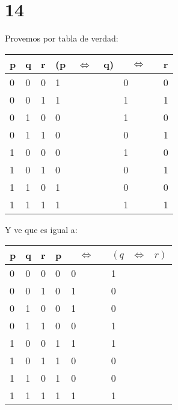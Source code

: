 \documentclass[12pt, fleqn]{article}                            %
\DeclareMathOperator \Space     {\quad}                         %
\DeclareMathOperator \MiniSpace {\;}                            %
\theoremstyle{break}                                            %
\newcommand \lEqual  {\MiniSpace \Leftrightarrow \MiniSpace}    %
\begin{document}
\clearpage
\section{14}

    Provemos por tabla de verdad: \\
    \begin{tabular}{|l|l|l|l|l|l|} 
        \hline
        p & q & r & (p $\lEqual$ q) &$\lEqual$  &r   \\ \hline
        0 & 0 & 0 &        1        &     0      &0   \\ \hline 
        0 & 0 & 1 &        1        &     1      &1   \\ \hline 
        0 & 1 & 0 &        0        &     1      &0   \\ \hline 
        0 & 1 & 1 &        0        &     0      &1   \\ \hline 
        1 & 0 & 0 &        0        &     1      &0   \\ \hline 
        1 & 0 & 1 &        0        &     0      &1   \\ \hline 
        1 & 1 & 0 &        1        &     0      &0   \\ \hline 
        1 & 1 & 1 &        1        &     1      &1   \\ \hline 
    \end{tabular}

    Y ve que es igual a: \\
        \begin{tabular}{|l|l|l|l|l|l|} 
        \hline
        p & q & r & p   & $\lEqual$   & $(q \lEqual r)$  \\ \hline
        0 & 0 & 0 & 0   &   0        &     1          \\ \hline 
        0 & 0 & 1 & 0   &   1        &     0          \\ \hline 
        0 & 1 & 0 & 0   &   1        &     0          \\ \hline 
        0 & 1 & 1 & 0   &   0        &     1          \\ \hline 
        1 & 0 & 0 & 1   &   1        &     1          \\ \hline 
        1 & 0 & 1 & 1   &   0        &     0          \\ \hline 
        1 & 1 & 0 & 1   &   0        &     0          \\ \hline 
        1 & 1 & 1 & 1   &   1        &     1          \\ \hline 
    \end{tabular}
\end{document}
